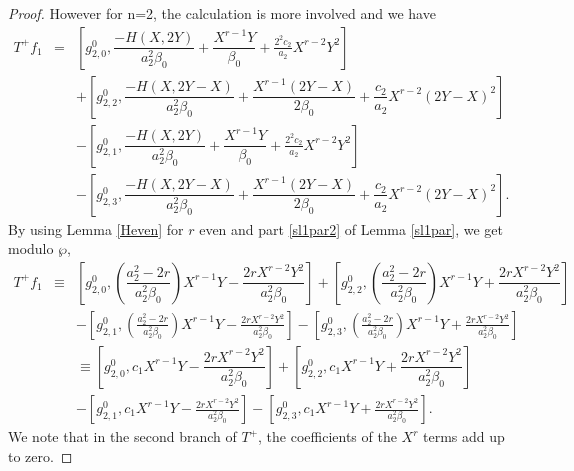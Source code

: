 \documentclass[11pt, reqno]{amsart}
\numberwithin{equation}{section}
\theoremstyle{definition}
\theoremstyle{remark}
\theoremstyle{definition}
\theoremstyle{remark}
\theoremstyle{remark}
\begin{document}
\begin{proof}
However for n=2, the calculation is more involved and we have
\begin{eqnarray*}
    T^{+}f_{1} &=& \left[g_{2,0}^{0}, \dfrac{-H(X,2Y)}{a_{2}^2\beta_{0}}+\dfrac{X^{r-1}Y}{\beta_{0}} +\frac{2^2c_{2}}{a_{2}}X^{r-2}Y^2\right]\\ 
    &&+ \left[g_{2,2}^{0}, \dfrac{-H(X,2Y-X)}{a_{2}^2\beta_{0}}+\dfrac{X^{r-1}(2Y-X)}{2\beta_{0}} +\dfrac{c_{2}}{a_{2}}X^{r-2}(2Y-X)^2\right] \\
    &&-\left[g_{2,1}^{0}, \dfrac{-H(X,2Y)}{a_{2}^2\beta_{0}}+\dfrac{X^{r-1}Y}{\beta_{0}}+\frac{2^2c_{2}}{a_2}X^{r-2}Y^2\right] \\ 
    &&-\left[g_{2,3}^{0}, \dfrac{-H(X,2Y-X)}{a_{2}^2\beta_{0}}+\dfrac{X^{r-1}(2Y-X)}{2\beta_{0}}+\dfrac{c_{2}}{a_{2}}X^{r-2}(2Y-X)^2\right]. 
\end{eqnarray*}
By using Lemma \ref{Heven} for $r$ even and part \eqref{sl1par2} of Lemma \ref{sl1par}, we get modulo $\wp$,
\begin{eqnarray}\label{F2'T+f1}
T^{+}f_{1}&\equiv &\left[ g_{2,0}^{0}, \left( \dfrac{a_{2}^2-2r}{a_{2}^2\beta_{0}}\right)X^{r-1}Y-\dfrac{2rX^{r-2}Y^2}{a_{2}^2\beta_{0}}  \right] + \left[ g_{2,2}^{0}, \left( \dfrac{a_{2}^2-2r}{a_{2}^2\beta_{0}}\right)X^{r-1}Y+\dfrac{2rX^{r-2}Y^2}{a_{2}^2\beta_{0}}  \right] \nonumber\\
 && - \left[ g_{2,1}^{0},  \left( \frac{a_{2}^2-2r}{a_{2}^2\beta_{0}}\right)X^{r-1}Y-\frac{2rX^{r-2}Y^2}{a_{2}^2\beta_{0}}\right] - \left[ g_{2,3}^{0},  \left( \frac{a_{2}^2-2r}{a_{2}^2\beta_{0}}\right)X^{r-1}Y+\frac{2rX^{r-2}Y^2}{a_{2}^2\beta_{0}}  \right] \nonumber\\
 && \equiv \left[ g_{2,0}^{0},  c_{1}X^{r-1}Y-\dfrac{2rX^{r-2}Y^2}{a_{2}^2\beta_{0}}  \right] + \left[ g_{2,2}^{0},  c_{1}X^{r-1}Y+\dfrac{2rX^{r-2}Y^2}{a_{2}^2\beta_{0}}  \right] \nonumber\\
 && - \left[ g_{2,1}^{0},   c_{1}X^{r-1}Y-\frac{2rX^{r-2}Y^2}{a_{2}^2\beta_{0}}\right] - \left[ g_{2,3}^{0}, c_{1}X^{r-1}Y+\frac{2rX^{r-2}Y^2}{a_{2}^2\beta_{0}}  \right].
 \end{eqnarray}
We note that in the second branch of $T^{+}$, the coefficients of the $X^{r}$ terms add up to zero.



\end{proof}
\end{document}
